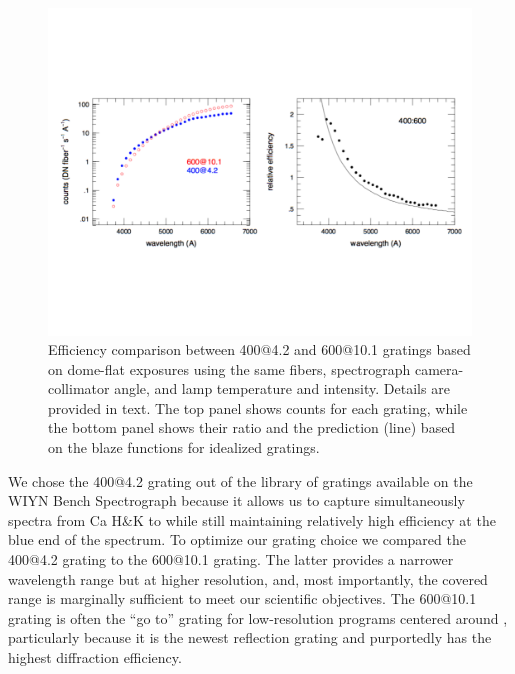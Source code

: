 \begin{figure}[htb]
\centering
\vskip -1.25in
  \includegraphics[width=\textwidth]{Appendix/figs/blaze_comp_land.pdf}
\vskip -1.25in
\caption[NGC 891 observing program grating
optimization]{\label{fig:grating_comp}\fixspacing Efficiency
  comparison between 400@4.2 and 600@10.1 gratings based on dome-flat
  exposures using the same fibers, spectrograph camera-collimator
  angle, and lamp temperature and intensity. Details are provided in
  text. The top panel shows counts for each grating, while the bottom
  panel shows their ratio and the prediction (line) based on the blaze
  functions for idealized gratings.}
\end{figure}




We chose the 400@4.2 grating out of the library of gratings available
on the WIYN Bench Spectrograph because it allows us to capture
simultaneously spectra from Ca H\&K to \Ha while still maintaining
relatively high efficiency at the blue end of the spectrum.  To
optimize our grating choice we compared the 400@4.2 grating to the
600@10.1 grating. The latter provides a narrower wavelength range but
at higher resolution, and, most importantly, the covered range is
marginally sufficient to meet our scientific objectives.  The 600@10.1
grating is often the ``go to'' grating for low-resolution programs
centered around , particularly because it is the newest
reflection grating and purportedly has the highest diffraction
efficiency.


